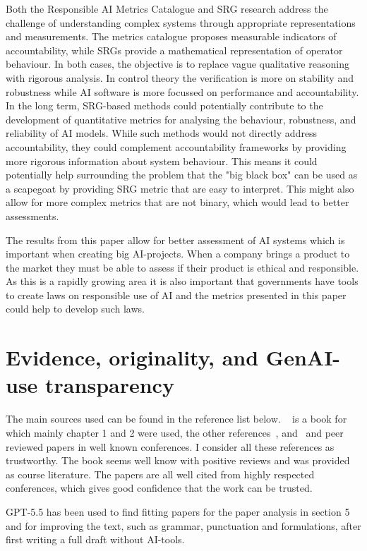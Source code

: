 \documentclass[a4paper, 11pt]{article}
\begin{document}
Both the Responsible AI Metrics Catalogue and SRG research address the challenge of understanding complex systems through appropriate representations and measurements. The metrics catalogue proposes measurable indicators of accountability, while SRGs provide a mathematical representation of operator behaviour. In both cases, the objective is to replace vague qualitative reasoning with rigorous analysis. In control theory the verification is more on stability and robustness while AI software is more focussed on performance and accountability. 
In the long term, SRG-based methods could potentially contribute to the development of quantitative metrics for analysing the behaviour, robustness, and reliability of AI models. While such methods would not directly address accountability, they could complement accountability frameworks by providing more rigorous information about system behaviour. This means it could potentially help surrounding the problem that the "big black box" can be used as a scapegoat by providing SRG metric that are easy to interpret. This might also allow for more complex metrics that are not binary, which would lead to better assessments.

The results from this paper allow for better assessment of AI systems which is important when creating big AI-projects. When a company brings a product to the market they must be able to assess if their product is ethical and responsible. As this is a rapidly growing area it is also important that governments have tools to create laws on responsible use of AI and the metrics presented in this paper could help to develop such laws. 
 
\section{Evidence, originality, and GenAI-use transparency}

The main sources used can be found in the reference list below. ~\cite{kastner2025machine} is a book for which mainly chapter 1 and 2 were used, the other references~\cite{NIPS2015_86df7dcf},\cite{Wu} and~\cite{AIMetrics} and peer reviewed papers in well known conferences. I consider all these references as trustworthy. The book seems well know with positive reviews and was provided as course literature. The papers are all well cited from highly respected conferences, which gives good confidence that the work can be trusted. 

GPT-5.5 has been used to find fitting papers for the paper analysis in section 5 and for improving the text, such as grammar, punctuation and formulations, after first writing a full draft without AI-tools. 


\end{document}
